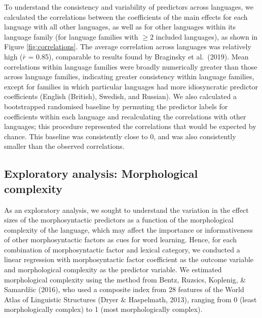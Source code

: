 \documentclass[10pt, letterpaper]{article}
\begin{document}
To understand the consistency and variability of predictors across
languages, we calculated the correlations between the coefficients of
the main effects for each language with all other languages, as well as
for other languages within its language family (for language families
with \(\ge 2\) included languages), as shown in Figure
\ref{fig:correlations}. The average correlation across languages was
relatively high (\(\bar{r}\) = 0.85), comparable to results found by
Braginsky et al.~(2019). Mean correlations within language families were
broadly numerically greater than those across language families,
indicating greater consistency within language families, except for
families in which particular languages had more idiosyncratic predictor
coefficients (English (British), Swedish, and Russian). We also
calculated a bootstrapped randomised baseline by permuting the predictor
labels for coefficients within each language and recalculating the
correlations with other languages; this procedure represented the
correlations that would be expected by chance. This baseline was
consistently close to 0, and was also consistently smaller than the
observed correlations.

\hypertarget{exploratory-analysis-morphological-complexity}{%
\subsection{Exploratory analysis: Morphological
complexity}\label{exploratory-analysis-morphological-complexity}}

As an exploratory analysis, we sought to understand the variation in the
effect sizes of the morphosyntactic predictors as a function of the
morphological complexity of the language, which may affect the
importance or informativeness of other morphosyntactic factors as cues
for word learning. Hence, for each combination of morphosyntactic factor
and lexical category, we conducted a linear regression with
morphosyntactic factor coefficient as the outcome variable and
morphological complexity as the predictor variable. We estimated
morphological complexity using the method from Bentz, Ruzsics, Koplenig,
\& Samardžic (2016), who used a composite index from 28 features of the
World Atlas of Linguistic Structures (Dryer \& Haspelmath, 2013),
ranging from 0 (least morphologically complex) to 1 (most
morphologically complex).
\end{document}
